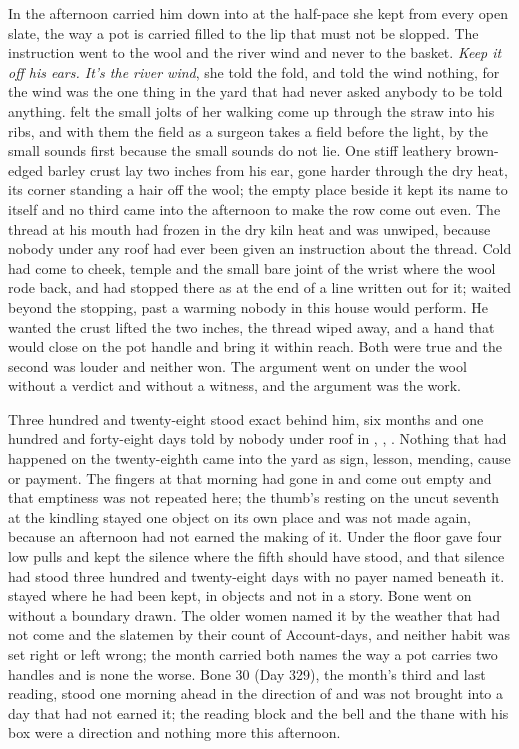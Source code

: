 In the afternoon  carried him down into  at the half-pace she kept from every open slate, the way a pot is carried filled to the lip that must not be slopped. The instruction went to the wool and the river wind and never to the basket. \emph{Keep it off his ears. It's the river wind}, she told the fold, and told the wind nothing, for the wind was the one thing in the yard that had never asked anybody to be told anything.  felt the small jolts of her walking come up through the straw into his ribs, and with them the field as a surgeon takes a field before the light, by the small sounds first because the small sounds do not lie. One stiff leathery brown-edged barley crust lay two inches from his ear, gone harder through the dry heat, its corner standing a hair off the wool; the empty place beside it kept its name to itself and no third came into the afternoon to make the row come out even. The thread at his mouth had frozen in the dry kiln heat and was unwiped, because nobody under any roof had ever been given an instruction about the thread. Cold had come to cheek, temple and the small bare joint of the wrist where the wool rode back, and had stopped there as at the end of a line written out for it;  waited beyond the stopping, past a warming nobody in this house would perform. He wanted the crust lifted the two inches, the thread wiped away, and a hand that would close on the pot handle and bring it within reach. Both were true and the second was louder and neither won. The argument went on under the wool without a verdict and without a witness, and the argument was the work.

Three hundred and twenty-eight stood exact behind him, six months and one hundred and forty-eight days told by nobody under  roof in , , . Nothing that had happened on the twenty-eighth came into the yard as sign, lesson, mending, cause or payment. The fingers at  that morning had gone in and come out empty and that emptiness was not repeated here; the thumb's resting on the uncut seventh at the kindling stayed one object on its own place and was not made again, because an afternoon had not earned the making of it. Under the floor  gave four low pulls and kept the silence where the fifth should have stood, and that silence had stood three hundred and twenty-eight days with no payer named beneath it.  stayed where he had been kept, in objects and not in a story. Bone went on without a boundary drawn. The older women named it by the weather that had not come and the slatemen by their count of Account-days, and neither habit was set right or left wrong; the month carried both names the way a pot carries two handles and is none the worse. Bone 30 (Day 329), the month's third and last reading, stood one morning ahead in the direction of  and was not brought into a day that had not earned it; the reading block and the bell and the thane with his box were a direction and nothing more this afternoon.

